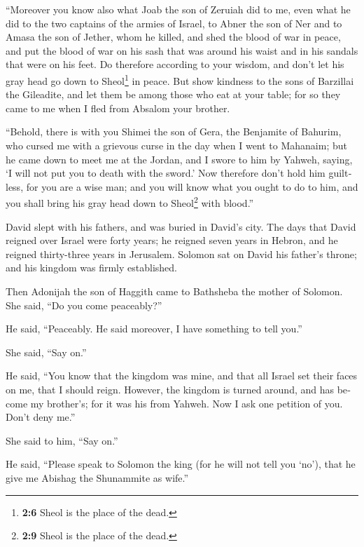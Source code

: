 \begin{paracol}{2}
\begin{otherlanguage}{english}
 ``Moreover you know also what Joab the son of Zeruiah did
to me, even what he did to the two captains of the armies of Israel, to
Abner the son of Ner and to Amasa the son of Jether, whom he killed, and
shed the blood of war in peace, and put the blood of war on his sash
that was around his waist and in his sandals that were on his feet.
 Do therefore according to your wisdom, and don't let his
gray head go down to Sheol\footnote{\textbf{2:6} Sheol is the place of
  the dead.} in peace.  But show kindness to the sons of
Barzillai the Gileadite, and let them be among those who eat at your
table; for so they came to me when I fled from Absalom your brother.

 ``Behold, there is with you Shimei the son of Gera, the
Benjamite of Bahurim, who cursed me with a grievous curse in the day
when I went to Mahanaim; but he came down to meet me at the Jordan, and
I swore to him by Yahweh, saying, `I will not put you to death with the
sword.'  Now therefore don't hold him guiltless, for you
are a wise man; and you will know what you ought to do to him, and you
shall bring his gray head down to Sheol\footnote{\textbf{2:9} Sheol is
  the place of the dead.} with blood.''

 David slept with his fathers, and was buried in David's
city.  The days that David reigned over Israel were forty
years; he reigned seven years in Hebron, and he reigned thirty-three
years in Jerusalem.  Solomon sat on David his father's
throne; and his kingdom was firmly established.

 Then Adonijah the son of Haggith came to Bathsheba the
mother of Solomon. She said, ``Do you come peaceably?''

He said, ``Peaceably.  He said moreover, I have something
to tell you.''

She said, ``Say on.''

 He said, ``You know that the kingdom was mine, and that
all Israel set their faces on me, that I should reign. However, the
kingdom is turned around, and has become my brother's; for it was his
from Yahweh.  Now I ask one petition of you. Don't deny
me.''

She said to him, ``Say on.''

 He said, ``Please speak to Solomon the king (for he will
not tell you `no'), that he give me Abishag the Shunammite as wife.''


\end{otherlanguage}
\end{paracol}

